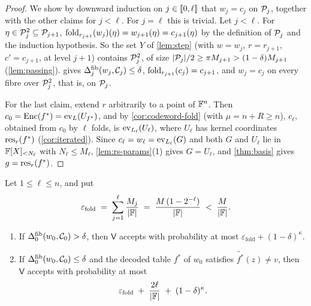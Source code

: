 \begin{proof}
We show by downward induction on $j \in \llbracket 0, \ell \rrbracket$ that $w_j = c_j$ on $\mathcal{P}_j$, together with the other claims for $j < \ell$. For $j = \ell$ this is trivial.
Let $j < \ell$. For $\eta \in \mathcal{P}_j^2 \subseteq \mathcal{P}_{j+1}$, $\mathrm{fold}_{r_{j+1}}(w_j)(\eta) = w_{j+1}(\eta) = c_{j+1}(\eta)$ by the definition of $\mathcal{P}_j$ and the induction hypothesis.
So the set $Y$ of \cref{lem:step} (with $w = w_j$, $r = r_{j+1}$, $c' = c_{j+1}$, at level $j+1$) contains $\mathcal{P}_j^2$, of size $|\mathcal{P}_j|/2 \ge \pi M_{j+1} > (1-\delta)M_{j+1}$ (\cref{lem:passing}).
 gives $\Delta^{\mathrm{fib}}_j(w_j,\mathcal{C}_j) \le \delta$, $\mathrm{fold}_{r_{j+1}}(c_j) = c_{j+1}$, and $w_j = c_j$ on every fibre over $\mathcal{P}_j^2$, that is, on $\mathcal{P}_j$.

For the last claim, extend $r$ arbitrarily to a point of $\mathbb{F}^n$. Then $c_0 = \mathrm{Enc}(f^*) = \mathrm{ev}_L(U_{f^*})$, and by \cref{cor:codeword-fold} (with $\mu = n + R \ge n$), $c_\ell$, obtained from $c_0$ by $\ell$ folds, is $\mathrm{ev}_{L_\ell}(U_\ell)$, where $U_\ell$ has kernel coordinates $\mathrm{res}_{r}(f^*)$ (\cref{cor:iterated}).
Since $c_\ell = w_\ell = \mathrm{ev}_{L_\ell}(G)$ and both $G$ and $U_\ell$ lie in $\mathbb{F}[X]_{<N_\ell}$ with $N_\ell \le M_\ell$, \cref{lem:rs-params}(1) gives $G = U_\ell$, and \cref{thm:basis} gives $g = \mathrm{res}_r(f^*)$.
\end{proof}

\begin{theorem}[Soundness]\label{thm:sound}
Let $1 \le \ell \le n$, and put
\[
  \varepsilon_{\mathrm{fold}} \;=\; \sum_{j=1}^{\ell} \frac{M_j}{|\mathbb{F}|} \;=\; \frac{M\,(1 - 2^{-\ell})}{|\mathbb{F}|} \;<\; \frac{M}{|\mathbb{F}|}.
\]
\begin{enumerate}
  \item If $\Delta^{\mathrm{fib}}_0(w_0, \mathcal{C}_0) > \delta$, then $\mathsf{V}$ accepts with probability at most $\varepsilon_{\mathrm{fold}} + (1-\delta)^{\kappa}$.
  \item If $\Delta^{\mathrm{fib}}_0(w_0, \mathcal{C}_0) \le \delta$ and the decoded table $f^*$ of $w_0$ satisfies $\tilde{f^*}(z) \ne v$, then $\mathsf{V}$ accepts with probability at most
  \[
    \varepsilon_{\mathrm{fold}} \;+\; \frac{2\ell}{|\mathbb{F}|} \;+\; (1-\delta)^{\kappa}.
  \]
\end{enumerate}
\end{theorem}

